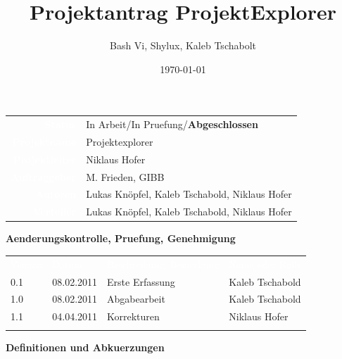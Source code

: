 \documentclass[10pt,paper=a4,final]{scrartcl}
\title{Projektantrag ProjektExplorer}
\author{Bash Vi, Shylux, Kaleb Tschabolt}
\date{\today}
\begin{document}
\maketitle
\newpage
\begin{tabularx}{\textwidth}{ r X }	%
  \textcolor{white}{{\bf Status}}\cellcolor{blue!80!} &  In Arbeit/In Pruefung/{\bf Abgeschlossen}\cellcolor{blue!20!} \\
\textcolor{white}{{\bf Projektname}}\cellcolor{blue!80!} & Projektexplorer\cellcolor{blue!20!} \\
\textcolor{white}{{\bf Projektleiter}}\cellcolor{blue!80!} & Niklaus Hofer\cellcolor{blue!20!} \\
\textcolor{white}{{\bf Auftraggeber}}\cellcolor{blue!80!} & M. Frieden, GIBB\cellcolor{blue!20!} \\
\textcolor{white}{{\bf Autoren}}\cellcolor{blue!80!} & Lukas Knöpfel, Kaleb Tschabold, Niklaus Hofer\cellcolor{blue!20!} \\
\textcolor{white}{{\bf Verteiler}}\cellcolor{blue!80!} & Lukas Knöpfel, Kaleb Tschabold, Niklaus Hofer\cellcolor{blue!20!}
\end{tabularx}
\newline
\newline
\newline
{\bf Aenderungskontrolle, Pruefung, Genehmigung}
\newline

\begin{tabularx}{\textwidth}{l l X X}
\textcolor{white}{Version}\cellcolor{blue!80!} & \textcolor{white}{Datum}\cellcolor{blue!80!} & \textcolor{white}{Beschreibung, Bemerkung}\cellcolor{blue!80!} & \textcolor{white}{Name oder Rolle}\cellcolor{blue!80!} \\
\cellcolor{blue!20!} 0.1 & \cellcolor{blue!20!} 08.02.2011 & \cellcolor{blue!20!} Erste Erfassung & \cellcolor{blue!20!} Kaleb Tschabold \\
\cellcolor{blue!20!} 1.0 & \cellcolor{blue!20!} 08.02.2011 & \cellcolor{blue!20!} Abgabearbeit & \cellcolor{blue!20!} Kaleb Tschabold \\
\cellcolor{blue!20!} 1.1 & \cellcolor{blue!20!} 04.04.2011 & \cellcolor{blue!20!} Korrekturen & \cellcolor{blue!20!} Niklaus Hofer\\
\cellcolor{blue!20!} & \cellcolor{blue!20!} & \cellcolor{blue!20!} & \cellcolor{blue!20!} \\
\end{tabularx}
\newline
\newline
\newline
{\bf Definitionen und Abkuerzungen}
\newline
\end{document}
